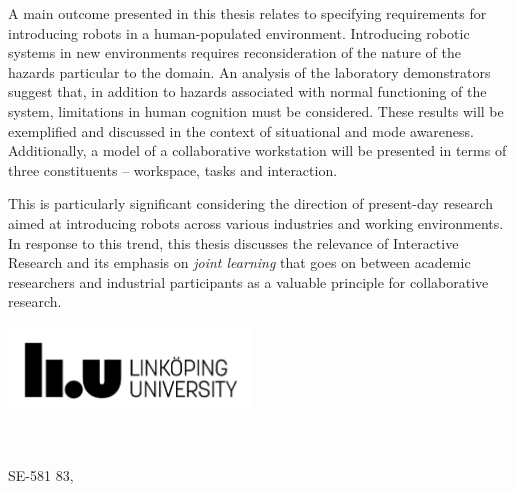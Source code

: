 \begin{small}
A main outcome presented in this thesis relates to specifying requirements for introducing robots in a human-populated environment. 
Introducing robotic systems in new environments requires reconsideration of the nature of the hazards particular to the domain.  An analysis of the laboratory demonstrators suggest that, in addition to hazards associated with normal functioning of the system, limitations in human cognition must be considered. These results will be exemplified and discussed in the context of situational and mode awareness. Additionally, a model of a collaborative workstation will be presented in terms of three constituents -- workspace, tasks and interaction. 

This is particularly significant considering the direction of present-day research aimed at introducing robots across various industries and working environments. In response to this trend, this thesis discusses the relevance of Interactive Research and its emphasis on \emph{joint learning} that goes on between academic researchers and industrial participants as a valuable principle for collaborative research.

  
  \end{small}
  \medskip
  


\begin{minipage}[b]{0.45\textwidth}
\includegraphics[width=6.50cm]{fig/logo}
\end{minipage}\quad~
 \begin{minipage}[b]{0.42\textwidth}
\myFaculty \newline
 \myDepartment \newline
 \myUni \newline
 SE-581 83, \myLocation \newline
\end{minipage}
